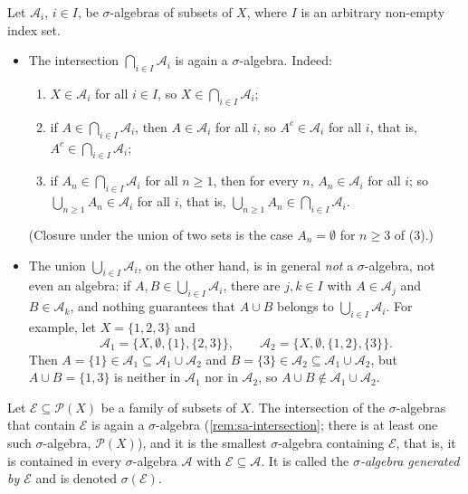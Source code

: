 \begin{remark}\label{rem:sa-intersection}
Let $\mathcal A_i$, $i\in I$, be $\sigma$-algebras of subsets of $X$, where $I$ is an arbitrary
non-empty index set.
\begin{itemize}
  \item The intersection $\bigcap_{i\in I}\mathcal A_i$ is again a $\sigma$-algebra. Indeed:
  \begin{enumerate}[label=(\arabic*)]
    \item $X\in\mathcal A_i$ for all $i\in I$, so $X\in\bigcap_{i\in I}\mathcal A_i$;
    \item if $A\in\bigcap_{i\in I}\mathcal A_i$, then $A\in\mathcal A_i$ for all $i$, so
      $A^c\in\mathcal A_i$ for all $i$, that is, $A^c\in\bigcap_{i\in I}\mathcal A_i$;
    \item if $A_n\in\bigcap_{i\in I}\mathcal A_i$ for all $n\ge1$, then for every $n$,
      $A_n\in\mathcal A_i$ for all $i$; so $\bigcup_{n\ge1}A_n\in\mathcal A_i$ for all $i$, that
      is, $\bigcup_{n\ge1}A_n\in\bigcap_{i\in I}\mathcal A_i$.
  \end{enumerate}
  (Closure under the union of two sets is the case $A_n=\emptyset$ for $n\ge3$ of (3).)
  \item The union $\bigcup_{i\in I}\mathcal A_i$, on the other hand, is in general \emph{not} a
    $\sigma$-algebra, not even an algebra: if $A,B\in\bigcup_{i\in I}\mathcal A_i$, there are
    $j,k\in I$ with $A\in\mathcal A_j$ and $B\in\mathcal A_k$, and nothing guarantees that
    $A\cup B$ belongs to $\bigcup_{i\in I}\mathcal A_i$. For example, let $X=\{1,2,3\}$ and
    \[
      \mathcal A_1=\{X,\emptyset,\{1\},\{2,3\}\},\qquad \mathcal A_2=\{X,\emptyset,\{1,2\},\{3\}\}.
    \]
    Then $A=\{1\}\in\mathcal A_1\subseteq\mathcal A_1\cup\mathcal A_2$ and
    $B=\{3\}\in\mathcal A_2\subseteq\mathcal A_1\cup\mathcal A_2$, but $A\cup B=\{1,3\}$ is
    neither in $\mathcal A_1$ nor in $\mathcal A_2$, so $A\cup B\notin\mathcal A_1\cup\mathcal A_2$.
\end{itemize}
\end{remark}

\begin{definition}\label{def:sa-generated}
Let $\mathcal E\subseteq\mathcal P(X)$ be a family of subsets of $X$. The intersection of the
$\sigma$-algebras that contain $\mathcal E$ is again a $\sigma$-algebra (\cref{rem:sa-intersection};
there is at least one such $\sigma$-algebra, $\mathcal P(X)$), and it is the smallest
$\sigma$-algebra containing $\mathcal E$, that is, it is contained in every $\sigma$-algebra
$\mathcal A$ with $\mathcal E\subseteq\mathcal A$. It is called the \emph{$\sigma$-algebra
generated by $\mathcal E$} and is denoted $\sigma(\mathcal E)$.
\end{definition}

